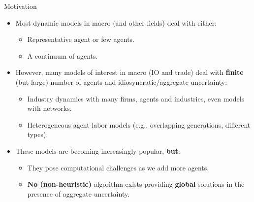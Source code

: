 \documentclass[aspectratio=169,10pt]{beamer}
\newcommand{\emphcolor}[1]{\textbf{\textcolor{emphcolorval}{#1}}}
\begin{document}
\begin{frame}{Motivation}
	\begin{itemize}
		\item Most dynamic models in macro (and other fields) deal with either:\vspace{0.1in}
		\begin{itemize}
		\item Representative agent or few agents.\vspace{0.1in}
		\item A continuum of agents.\vspace{0.1in}
		\end{itemize} 
	\item However, many models of interest in macro (IO and trade) deal with \emphcolor{finite} (but large) number of agents and idiosyncratic/aggregate uncertainty:\vspace{0.1in}
		\begin{itemize}
		\item Industry dynamics with many firms, agents and industries,  even models with networks.\vspace{0.1in}
		\item Heterogeneous agent labor models (e.g., overlapping generations, different types).\vspace{0.1in}
		
	\end{itemize}
	\item These models are becoming increasingly popular, \emphcolor{but}:\vspace{0.1in}
		\begin{itemize}
			\item They pose computational challenges as we add more agents.\vspace{0.1in}
			\item \emphcolor{No (non-heuristic)} algorithm exists providing \emphcolor{global} solutions in the presence of aggregate uncertainty.  
		\end{itemize}	
	\end{itemize}	
	



\end{frame}
\end{document}
